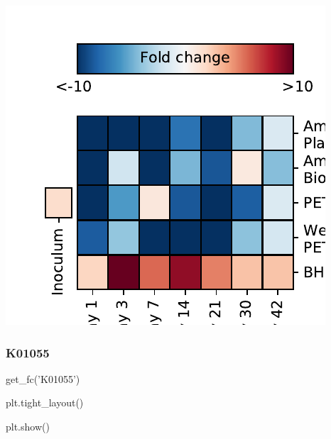 \documentclass[
]{article}
\newenvironment{Shaded}{\begin{snugshade}}{\end{snugshade}}
\newcommand{\NormalTok}[1]{#1}
\newcommand{\StringTok}[1]{\textcolor[rgb]{0.31,0.60,0.02}{#1}}
\begin{document}
\includegraphics{20-6-15-PET-plastisphere-PICRUSt2_files/figure-latex/plot_fc_K14727-1.pdf}

\hypertarget{k01055-1}{%
\subsubsection{K01055}\label{k01055-1}}

\begin{Shaded}
\begin{Highlighting}[]
\NormalTok{get_fc(}\StringTok{'K01055'}\NormalTok{)}
\end{Highlighting}
\end{Shaded}

\begin{Shaded}
\begin{Highlighting}[]
\NormalTok{plt.tight_layout()}
\end{Highlighting}
\end{Shaded}

\begin{Shaded}
\begin{Highlighting}[]
\NormalTok{plt.show()}
\end{Highlighting}
\end{Shaded}
\end{document}
